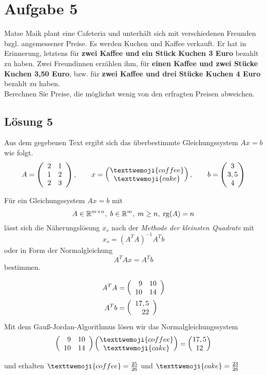 \documentclass[main.tex]{subfiles}
\begin{document}
\section{Aufgabe 5}
Matse Maik plant eine Cafeteria und unterhält sich mit verschiedenen Freunden bzgl. angemessener Preise.
Es werden Kuchen und Kaffee verkauft. Er hat in Erinnerung, letztens für \textbf{zwei Kaffee und ein Stück Kuchen 3 Euro} bezahlt zu haben.
Zwei Freundinnen erzählen ihm, für \textbf{einen Kaffee und zwei Stücke Kuchen 3,50 Euro}, 
bzw. für \textbf{zwei Kaffee und drei Stücke Kuchen 4 Euro} bezahlt zu haben.\\
Berechnen Sie Preise, die möglichst wenig von den erfragten Preisen abweichen.

\subsection{Lösung 5}
Aus dem gegebenen Text ergibt sich das überbestimmte Gleichungssystem $Ax=b$ wie folgt.
$$
    A = \eqmatrix{rr}{
        2 & 1 \\
        1 & 2 \\
        2 & 3 \\
    }, \qquad
    x = \vektor{
        \texttwemoji{coffee} \\
        \texttwemoji{cake}
    }, \qquad
    b = \vektor{
        3 \\
        3,5 \\
        4
    }
$$

Für ein Gleichungssystem $Ax=b$ mit
$$
    A\in \mathbb{R}^{m\times n},\; b\in\mathbb{R}^m,\; m\geq n, \; \rg(A) = n
$$
lässt sich die Näherungslösung $x_s$ nach der \textit{Methode der kleinsten Quadrate} mit
$$
    x_s = \left( A^T A \right)^{-1} A^T b
$$
oder in Form der Normalgleichung
$$
    A^TAx = A^Tb
$$
bestimmen.

\begin{align*}
    A^T A &= \eqmatrix{rr}{9 & 10 \\ 10 & 14} \\
    A^T b &= \eqmatrix{r}{17,5 \\ 22} \\
\end{align*}
Mit dem Gauß-Jordan-Algorithmus lösen wir das Normalgleichungssystem
$$
    \eqmatrix{rr}{9 & 10 \\ 10 & 14} \vektor{
        \texttwemoji{coffee} \\
        \texttwemoji{cake}
    } = \vektor{17,5 \\ 12}
$$

und erhalten $\texttwemoji{coffee} = \frac{25}{26}$ und $\texttwemoji{cake} =\frac{23}{26}$
\end{document}
